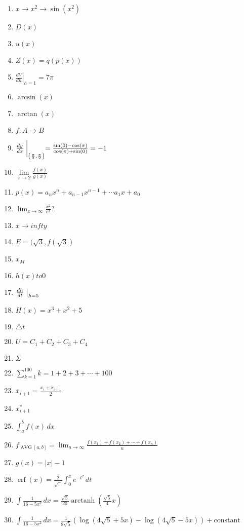 \documentclass[oneside,10pt,]{article}
\DeclareMathOperator{\erf}{erf}
\DeclareMathOperator{\arctanh}{arctanh}
\begin{document}
\begin{enumerate}
\item{}\(x \longrightarrow x^2 \longrightarrow \sin(x^2)\)%
\item{}\(D(x)\)%
\item{}\(u(x)\)%
\item{}\(Z(x) = q(p(x))\)%
\item{}\(\left. \frac{dV}{dh} \right|_{h=1} = 7 \pi\)%
\item{}\(\arcsin(x)\)%
\item{}\(\arctan(x)\)%
\item{}\(f : A \to B\)%
\item{}\(\frac{dy}{dx}\biggm|_{\left(\frac{\pi}{2}, \frac{\pi}{2}\right)} = \frac{\sin(0)-\cos(\pi)}{\cos(\pi) + \sin(0)} = -1\)%
\item{}\(\lim\limits_{x \to 2} \frac{f(x)}{g(x)}\)%
\item{}\(p(x) = a_n x^n + a_{n-1}x^{n-1} + \cdots a_1 x + a_0\)%
\item{}\(\lim_{x \to \infty} \frac{x^2}{e^x}?\)%
\item{}\(x \to infty\)%
\item{}\(E = (\sqrt{3}, f(\sqrt{3})\)%
\item{}\(x_M\)%
\item{}\(h(x) to 0\)%
\item{}\(\frac{dh}{dt}\bigm|_{h=5}\)%
\item{}\(H(x) = x^3 + x^2 + 5\)%
\item{}\(\triangle t\)%
\item{}\(U = C_1 + C_2 + C_3 + C_4\)%
\item{}\(\Sigma\)%
\item{}\(\sum_{k=1}^{100} k =  1 + 2 + 3 + \cdots + 100\)%
\item{}\(\overline{x}_{i+1} = \frac{x_{i} + x_{i+1}}{2}\)%
\item{}\(x_{i+1}^*\)%
\item{}\(\int_a^b f(x) \, dx\)%
\item{}\(f_{\operatorname{AVG} [a,b]} = \lim_{n \to \infty} \frac{f(x_1) + f(x_2) + \cdots + f(x_n)}{n}\)%
\item{}\(g(x) = \left| x \right| - 1\)%
\item{}\(\erf (x) = \frac{2}{\sqrt{\pi}} \int_0^x e^{-t^2} \,dt\)%
\item{}\(\int \frac{1}{16-5x^2} \, dx = \frac{\sqrt{5}}{20} \arctanh  (\frac{\sqrt{5}}{4}x)\)%
\item{}\(\int \frac{1}{16-5x^2} \, dx = \frac{1}{8\sqrt{5}} \left(\log(4\sqrt{5}+5x) - \log(4\sqrt{5}-5x)\right) + \text{constant}\)%

\end{enumerate}
\end{document}
